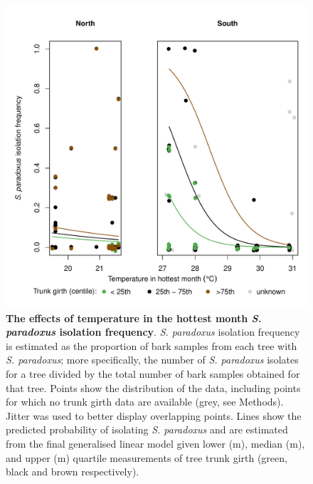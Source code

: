 \documentclass[12pt]{article}
\begin{document}
\begin{figure}[h!] \centering 
\includegraphics[width=1.0\textwidth]{../figs_tables/Figure3Tmax.pdf} 
\caption{{\bf The effects of temperature in the hottest month \textit{S. paradoxus} isolation frequency}. \textit{S. paradoxus} isolation frequency is estimated as the proportion of bark samples from each tree with \textit{S. paradoxus}; more specifically, the number of \textit{S. paradoxus} isolates for a tree divided by the total number of bark samples obtained for that tree. Points show the distribution of the data, including points for which no trunk girth data are available (grey, see Methods). Jitter was used to better display overlapping points. Lines show the predicted probability of isolating \textit{S. paradoxus} and are estimated from the final generalised linear model given lower (\circumlq m), median (\circummd m), and upper (\circumuq m) quartile measurements of tree trunk girth (green, black and brown respectively).} 
\label{fig:tmax_figure} 
\end{figure}
\clearpage
\end{document}
